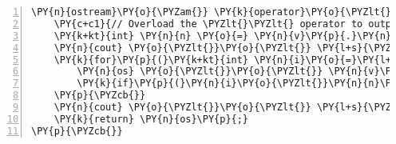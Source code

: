 \begin{Verbatim}[tabsize=2,commandchars=\\\{\},numbers=left,firstnumber=1,stepnumber=1]
\PY{n}{ostream}\PY{o}{\PYZam{}} \PY{k}{operator}\PY{o}{\PYZlt{}}\PY{o}{\PYZlt{}}\PY{p}{(}\PY{n}{ostream}\PY{o}{\PYZam{}} \PY{n}{os}\PY{p}{,} \PY{k}{const} \PY{n}{MVector}\PY{o}{\PYZam{}} \PY{n}{v}\PY{p}{)} \PY{p}{\PYZob{}}
	\PY{c+c1}{// Overload the \PYZlt{}\PYZlt{} operator to output MVectors to screen or file}
	\PY{k+kt}{int} \PY{n}{n} \PY{o}{=} \PY{n}{v}\PY{p}{.}\PY{n}{size}\PY{p}{(}\PY{p}{)}\PY{p}{;}
	\PY{n}{cout} \PY{o}{\PYZlt{}}\PY{o}{\PYZlt{}} \PY{l+s}{\PYZdq{}}\PY{l+s}{(}\PY{l+s}{\PYZdq{}}\PY{p}{;}
	\PY{k}{for}\PY{p}{(}\PY{k+kt}{int} \PY{n}{i}\PY{o}{=}\PY{l+m+mi}{0}\PY{p}{;} \PY{n}{i}\PY{o}{\PYZlt{}}\PY{n}{n}\PY{p}{;} \PY{n}{i}\PY{o}{+}\PY{o}{+}\PY{p}{)} \PY{p}{\PYZob{}}
		\PY{n}{os} \PY{o}{\PYZlt{}}\PY{o}{\PYZlt{}} \PY{n}{v}\PY{p}{[}\PY{n}{i}\PY{p}{]}\PY{p}{;}
		\PY{k}{if}\PY{p}{(}\PY{n}{i}\PY{o}{\PYZlt{}}\PY{n}{n}\PY{o}{\PYZhy{}}\PY{l+m+mi}{1}\PY{p}{)} \PY{n}{cout} \PY{o}{\PYZlt{}}\PY{o}{\PYZlt{}} \PY{l+s}{\PYZdq{}}\PY{l+s}{,}\PY{l+s}{\PYZdq{}}\PY{p}{;}
	\PY{p}{\PYZcb{}}
	\PY{n}{cout} \PY{o}{\PYZlt{}}\PY{o}{\PYZlt{}} \PY{l+s}{\PYZdq{}}\PY{l+s}{)}\PY{l+s}{\PYZdq{}}\PY{p}{;}
	\PY{k}{return} \PY{n}{os}\PY{p}{;}
\PY{p}{\PYZcb{}}
\end{Verbatim}
